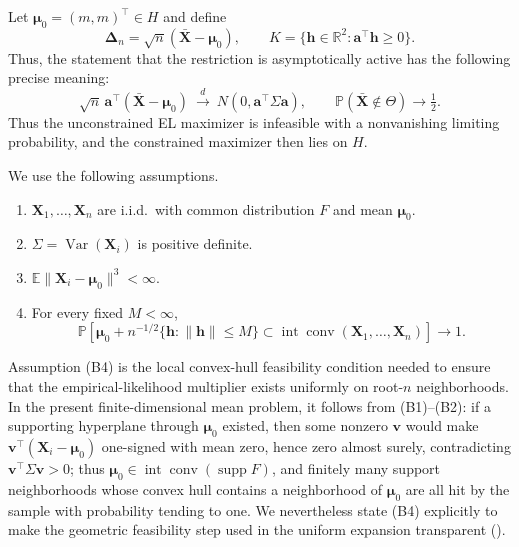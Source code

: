 \documentclass[11pt]{article}
\theoremstyle{remark}
\newcommand{\R}{\mathbb{R}}
\newcommand{\E}{\mathbb{E}}
\newcommand{\Pp}{\mathbb{P}}
\newcommand{\conv}{\operatorname{conv}}
\newcommand{\interior}{\operatorname{int}}
\begin{document}
Let $\boldsymbol{\mu}_0=(m,m)^\top\in H$ and define
$$
  \boldsymbol{\Delta}_n=\sqrt n(\bar{\boldsymbol{X}}-\boldsymbol{\mu}_0),
  \qquad
  K=\{\boldsymbol{h}\in\R^2:\boldsymbol{a}^\top \boldsymbol{h}\geq0\}.
$$
Thus, the statement that the restriction is asymptotically active has the following precise meaning:
$$
  \sqrt n\,\boldsymbol{a}^\top(\bar{\boldsymbol{X}}-\boldsymbol{\mu}_0)
  \ \xrightarrow{d}\
  N(0,\boldsymbol{a}^\top\Sigma\boldsymbol{a}),
  \qquad
  \Pp(\bar{\boldsymbol{X}}\notin\Theta)\to\tfrac12.
$$
Thus the unconstrained EL maximizer is infeasible with a nonvanishing limiting probability, and the constrained maximizer then lies on $H$.

We use the following assumptions.
\begin{enumerate}[label=(B\arabic*),leftmargin=*,itemsep=2pt]
\item $\boldsymbol{X}_1,\ldots,\boldsymbol{X}_n$ are i.i.d.\ with common distribution $F$ and mean $\boldsymbol{\mu}_0$.
\item $\Sigma=\operatorname{Var}(\boldsymbol{X}_i)$ is positive definite.
\item $\E\|\boldsymbol{X}_i-\boldsymbol{\mu}_0\|^3<\infty$.
\item For every fixed $M<\infty$,
$$
    \Pp\left[
    \boldsymbol{\mu}_0+n^{-1/2}\{\boldsymbol{h}:\|\boldsymbol{h}\|\leq M\}
    \subset\interior\conv(\boldsymbol{X}_1,\ldots,\boldsymbol{X}_n)
    \right]\to1.
$$
\end{enumerate}
Assumption (B4) is the local convex-hull feasibility condition needed to ensure that the empirical-likelihood multiplier exists uniformly on root-$n$ neighborhoods. In the present finite-dimensional mean problem, it follows from (B1)--(B2): if a supporting hyperplane through $\boldsymbol{\mu}_0$ existed, then some nonzero $\boldsymbol{v}$ would make $\boldsymbol{v}^{\top}(\boldsymbol{X}_i-\boldsymbol{\mu}_0)$ one-signed with mean zero, hence zero almost surely, contradicting $\boldsymbol{v}^{\top}\Sigma\boldsymbol{v}>0$; thus $\boldsymbol{\mu}_0\in\interior\conv(\operatorname{supp}F)$, and finitely many support neighborhoods whose convex hull contains a neighborhood of $\boldsymbol{\mu}_0$ are all hit by the sample with probability tending to one. We nevertheless state (B4) explicitly to make the geometric feasibility step used in the uniform expansion transparent (\citet{owen1990, owen2001}). \\

\end{document}
